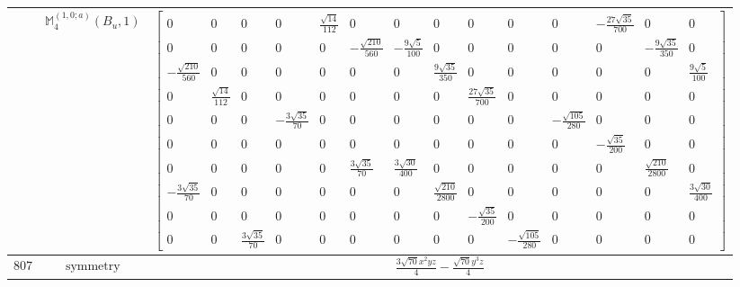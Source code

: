 \documentclass[fleqn,8pt,landscape]{jsarticle}
\begin{document}
\begin{longtable}{ccc}
$  $ & $ \mathbb{M}_{4}^{(1,0;a)}(B_{u},1) $ & $ \begin{bmatrix} 0 & 0 & 0 & 0 & \frac{\sqrt{14}}{112} & 0 & 0 & 0 & 0 & 0 & 0 & - \frac{27 \sqrt{35}}{700} & 0 & 0 \\ 0 & 0 & 0 & 0 & 0 & - \frac{\sqrt{210}}{560} & - \frac{9 \sqrt{5}}{100} & 0 & 0 & 0 & 0 & 0 & - \frac{9 \sqrt{35}}{350} & 0 \\ - \frac{\sqrt{210}}{560} & 0 & 0 & 0 & 0 & 0 & 0 & \frac{9 \sqrt{35}}{350} & 0 & 0 & 0 & 0 & 0 & \frac{9 \sqrt{5}}{100} \\ 0 & \frac{\sqrt{14}}{112} & 0 & 0 & 0 & 0 & 0 & 0 & \frac{27 \sqrt{35}}{700} & 0 & 0 & 0 & 0 & 0 \\ 0 & 0 & 0 & - \frac{3 \sqrt{35}}{70} & 0 & 0 & 0 & 0 & 0 & 0 & - \frac{\sqrt{105}}{280} & 0 & 0 & 0 \\ 0 & 0 & 0 & 0 & 0 & 0 & 0 & 0 & 0 & 0 & 0 & - \frac{\sqrt{35}}{200} & 0 & 0 \\ 0 & 0 & 0 & 0 & 0 & \frac{3 \sqrt{35}}{70} & \frac{3 \sqrt{30}}{400} & 0 & 0 & 0 & 0 & 0 & \frac{\sqrt{210}}{2800} & 0 \\ - \frac{3 \sqrt{35}}{70} & 0 & 0 & 0 & 0 & 0 & 0 & \frac{\sqrt{210}}{2800} & 0 & 0 & 0 & 0 & 0 & \frac{3 \sqrt{30}}{400} \\ 0 & 0 & 0 & 0 & 0 & 0 & 0 & 0 & - \frac{\sqrt{35}}{200} & 0 & 0 & 0 & 0 & 0 \\ 0 & 0 & \frac{3 \sqrt{35}}{70} & 0 & 0 & 0 & 0 & 0 & 0 & - \frac{\sqrt{105}}{280} & 0 & 0 & 0 & 0 \end{bmatrix} $ \\ \hline
$ 807 $ & $ \text{symmetry} $ & $ \frac{3 \sqrt{70} x^{2} y z}{4} - \frac{\sqrt{70} y^{3} z}{4} $ \\

\end{longtable}
\end{document}
